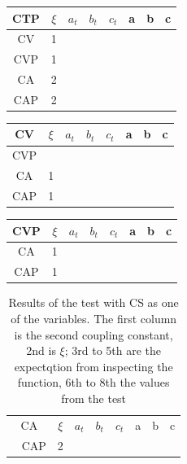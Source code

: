 \documentclass[twocolumn]{article}
\begin{document}
\begin{table}[H]
	\begin{tabular}{|c|c|c|c|c|c|c|c|}
		\hline
		CTP & $\xi $& $a_t$ & $b_t$ & $c_t$ & a & b & c \\
		\hline
		CV & 1 &   &   &   &   &   &   \\
		\hline
		CVP & 1 &   &   &   &   &   &   \\
		\hline
		CA & 2 &   &   &   &   &   &   \\
		\hline
		CAP & 2 &   &   &   &   &   &   \\
		\hline
	\end{tabular}
\end{table}

\begin{table}[H]
	\begin{tabular}{|c|c|c|c|c|c|c|c|}
		\hline
		CV & $\xi $& $a_t$ & $b_t$ & $c_t$ & a & b & c \\
		\hline
		CVP &   &   &   &   &   &   &   \\
		\hline
		CA & 1 &   &   &   &   &   &   \\
		\hline
		CAP & 1 &   &   &   &   &   &   \\
		\hline
	\end{tabular}
\end{table}

\begin{table}[H]
	\begin{tabular}{|c|c|c|c|c|c|c|c|}
		\hline
		CVP & $\xi $& $a_t$ & $b_t$ & $c_t$ & a & b & c \\
		\hline
		CA & 1 &   &   &   &   &   &   \\
		\hline
		CAP & 1 &   &   &   &   &   &   \\
		\hline
	\end{tabular}
\end{table}

\begin{table}[H]
	\begin{tabular}{|c|c|c|c|c|c|c|c|}
		\hline
		CA & $\xi $& $a_t$ & $b_t$ & $c_t$ & a & b & c \\\
		\hline
		CAP & 2 &   &   &   &   &   &   \\
		\hline
	\end{tabular}
	\caption{Results of the test with CS as one of the variables. The first column is the second coupling constant, 2nd is $\xi$; 3rd to 5th are the expectqtion from inspecting the function, 6th to 8th the values from the test}
\end{table}
\end{document}
